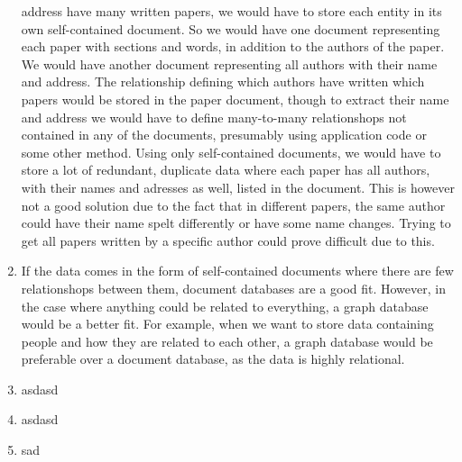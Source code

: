 \begin{enumerate}
        address have many written papers, we would have to store each entity
        in its own self-contained document. So we would have one document
        representing each paper with sections and words, in addition to the 
        authors of the paper. We would have another document representing all 
        authors with their name and address. The relationship defining which
        authors have written which papers would be stored in the paper document,
        though to extract their name and address we would have to define 
        many-to-many relationshops not contained in any of the documents,
        presumably using application code or some other method. Using only
        self-contained documents, we would have to store a lot of redundant, 
        duplicate data where each paper has all authors, with their names and 
        adresses as well, listed in the document. This is however not a good 
        solution due to the fact that in different papers, the same author could
        have their name spelt differently or have some name changes. Trying
        to get all papers written by a specific author could prove difficult
        due to this.
    \item 
        If the data comes in the form of self-contained documents where there 
        are few relationshops between them, document databases are a good fit.
        However, in the case where anything could be related to everything, a 
        graph database would be a better fit. For example, when we want to store
        data containing people and how they are related to each other, a graph
        database would be preferable over a document database, as the data is
        highly relational.
    \item 
        asdasd 
    \item 
        asdasd
    \item
        sad
  \end{enumerate}
